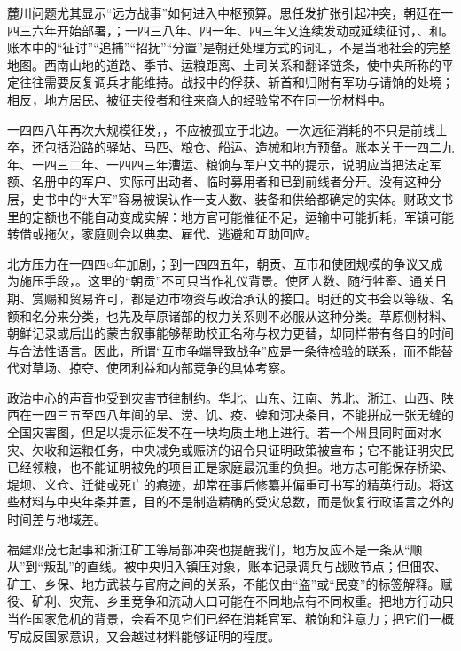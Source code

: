 麓川问题尤其显示“远方战事”如何进入中枢预算。思任发扩张引起冲突，朝廷在一四三六年开始部署，；一四三八年、四一年、四三年又连续发动或延续征讨，、和。账本中的“征讨”“追捕”“招抚”“分置”是朝廷处理方式的词汇，不是当地社会的完整地图。西南山地的道路、季节、运粮距离、土司关系和翻译链条，使中央所称的平定往往需要反复调兵才能维持。战报中的俘获、斩首和归附有军功与请饷的处境；相反，地方居民、被征夫役者和往来商人的经验常不在同一份材料中。

一四四八年再次大规模征发，，不应被孤立于北边。一次远征消耗的不只是前线士卒，还包括沿路的驿站、马匹、粮仓、船运、造械和地方预备。账本关于一四二九年、一四三二年、一四四三年漕运、粮饷与军户文书的提示，说明应当把法定军额、名册中的军户、实际可出动者、临时募用者和已到前线者分开。没有这种分层，史书中的“大军”容易被误认作一支人数、装备和供给都确定的实体。财政文书里的定额也不能自动变成实解：地方官可能催征不足，运输中可能折耗，军镇可能转借或拖欠，家庭则会以典卖、雇代、逃避和互助回应。

北方压力在一四四○年加剧，；到一四四五年，朝贡、互市和使团规模的争议又成为施压手段，。这里的“朝贡”不可只当作礼仪背景。使团人数、随行牲畜、通关日期、赏赐和贸易许可，都是边市物资与政治承认的接口。明廷的文书会以等级、名额和名分来分类，也先及草原诸部的权力关系则不必服从这种分类。草原侧材料、朝鲜记录或后出的蒙古叙事能够帮助校正名称与权力更替，却同样带有各自的时间与合法性语言。因此，所谓“互市争端导致战争”应是一条待检验的联系，而不能替代对草场、掠夺、使团利益和内部竞争的具体考察。

政治中心的声音也受到灾害节律制约。华北、山东、江南、苏北、浙江、山西、陕西在一四三五至四八年间的旱、涝、饥、疫、蝗和河决条目，不能拼成一张无缝的全国灾害图，但足以提示征发不在一块均质土地上进行。若一个州县同时面对水灾、欠收和运粮任务，中央减免或赈济的诏令只证明政策被宣布；它不能证明灾民已经领粮，也不能证明被免的项目正是家庭最沉重的负担。地方志可能保存桥梁、堤坝、义仓、迁徙或死亡的痕迹，却常在事后修纂并偏重可书写的精英行动。将这些材料与中央年条并置，目的不是制造精确的受灾总数，而是恢复行政语言之外的时间差与地域差。

福建邓茂七起事和浙江矿工等局部冲突也提醒我们，地方反应不是一条从“顺从”到“叛乱”的直线。被中央归入镇压对象，账本记录调兵与战败节点；但佃农、矿工、乡保、地方武装与官府之间的关系，不能仅由“盗”或“民变”的标签解释。赋役、矿利、灾荒、乡里竞争和流动人口可能在不同地点有不同权重。把地方行动只当作国家危机的背景，会看不见它们已经在消耗官军、粮饷和注意力；把它们一概写成反国家意识，又会越过材料能够证明的程度。

